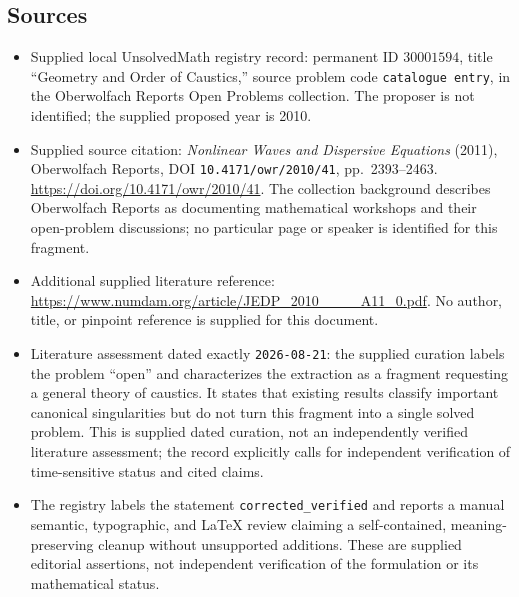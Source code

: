 \documentclass[11pt]{article}
\begin{document}
\subsection{Sources}
\begin{itemize}
\item Supplied local UnsolvedMath registry record: permanent ID \(30001594\), title ``Geometry and Order of Caustics,'' source problem code \texttt{catalogue entry}, in the Oberwolfach Reports Open Problems collection. The proposer is not identified; the supplied proposed year is 2010.
\item Supplied source citation: \emph{Nonlinear Waves and Dispersive Equations} (2011), Oberwolfach Reports, DOI \texttt{10.4171/owr/2010/41}, pp.\ 2393--2463. \url{https://doi.org/10.4171/owr/2010/41}. The collection background describes Oberwolfach Reports as documenting mathematical workshops and their open-problem discussions; no particular page or speaker is identified for this fragment.
\item Additional supplied literature reference: \url{https://www.numdam.org/article/JEDP_2010____A11_0.pdf}. No author, title, or pinpoint reference is supplied for this document.
\item Literature assessment dated exactly \texttt{2026-08-21}: the supplied curation labels the problem ``open'' and characterizes the extraction as a fragment requesting a general theory of caustics. It states that existing results classify important canonical singularities but do not turn this fragment into a single solved problem. This is supplied dated curation, not an independently verified literature assessment; the record explicitly calls for independent verification of time-sensitive status and cited claims.
\item The registry labels the statement \texttt{corrected\_verified} and reports a manual semantic, typographic, and LaTeX review claiming a self-contained, meaning-preserving cleanup without unsupported additions. These are supplied editorial assertions, not independent verification of the formulation or its mathematical status.
\end{itemize}
\end{document}
